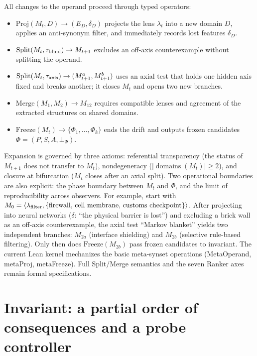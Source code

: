 \documentclass[11pt,a4paper]{article}
\begin{document}
All changes to the operand proceed through typed operators:

\begin{itemize}
\item \(\mathrm{Proj}(M_t,D)\to(E_D,\delta_D)\) projects the lens \(\lambda_t\) into a new domain \(D\), applies an anti-synonym filter, and immediately records lost features \(\delta_D\).
\item \(\mathrm{Split}(M_t,\tau_{\rm blind})\to M_{t+1}\) excludes an off-axis counterexample without splitting the operand.
\item \(\mathrm{Split}(M_t,\tau_{\rm axis})\to(M^a_{t+1},M^b_{t+1})\) uses an axial test that holds one hidden axis fixed and breaks another; it closes \(M_t\) and opens two new branches.
\item \(\mathrm{Merge}(M_1,M_2)\to M_{12}\) requires compatible lenses and agreement of the extracted structures on shared domains.
\item \(\mathrm{Freeze}(M_t)\to\{\Phi_1,\ldots,\Phi_k\}\) ends the drift and outputs frozen candidates \(\Phi=(P,S,A,\bot_\Phi)\).

\end{itemize}
Expansion is governed by three axioms: referential transparency (the status of \(M_{t+1}\) does not transfer to \(M_t\)), nondegeneracy (\(|\operatorname{domains}(M_t)|\ge2\)), and closure at bifurcation (\(M_t\) closes after an axial split). Two operational boundaries are also explicit: the phase boundary between \(M_t\) and \(\Phi\), and the limit of reproducibility across observers. For example, start with \(M_0=\langle\lambda_{\rm filter},\{\text{firewall, cell membrane, customs checkpoint}\}\rangle\). After projecting into neural networks (\(\delta\): “the physical barrier is lost”) and excluding a brick wall as an off-axis counterexample, the axial test “Markov blanket” yields two independent branches: \(M_{2a}\) (interface shielding) and \(M_{2b}\) (selective rule-based filtering). Only then does \(\mathrm{Freeze}(M_{2b})\) pass frozen candidates to invariant. The current Lean kernel mechanizes the basic meta-synset operations (MetaOperand, metaProj, metaFreeze). Full Split/Merge semantics and the seven Ranker axes remain formal specifications.

\section{Invariant: a partial order of consequences and a probe controller}
\end{document}
